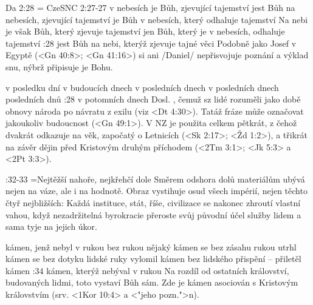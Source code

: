 \renum Da 2:28 = CzeSNC 2:27-27
    {v nebesích je Bůh, zjevující tajemství}  %
    {jest Bůh na nebesích, zjevující tajemství}  %
    {je Bůh v nebesích, který odhaluje tajemství}  %
    {Na nebi je však Bůh, který zjevuje tajemství}  %
    {jen Bůh, který je v nebesích, odhaluje tajemství}  %
:28 {jest Bůh na nebi, kterýž zjevuje tajné věci} Podobně jako Josef v Egyptě (<Gn 40:8>; <Gn 41:16>) si ani \x/Daniel/ nepřisvojuje poznání a výklad snu, nýbrž připisuje je Bohu.

    {v posledku dní} %
    {v budoucích dnech}  %
    {v posledních dnech} %
    {v posledních dnech}  %
    {posledních dnů}  %
:28 {v potomních dnech} Dosl. , čemuž sz lidé rozuměli jako době obnovy národa po návratu z exilu (viz <Dt 4:30>). Tatáž fráze může označovat 
    jakoukoliv budoucnost  (<Gn 49:1>).  V NZ je použita celkem pětkrát, z čehož dvakrát odkazuje na věk, započatý o Letnicích (<Sk 2:17>; <Žd 1:2>), a třikrát na závěr dějin před Kristovým druhým příchodem (<2Tm 3:1>; <Jk 5:3> a <2Pt 3:3>). 

:32-33 {}={Nejtěžší nahoře, nejkřehčí dole} Směrem odshora dolů materiálům ubývá nejen na váze, ale i na hodnotě. Obraz vystihuje osud všech impérií,  nejen těchto čtyř nejbližších: 
    Každá instituce, stát, říše, civilizace se nakonec zhroutí vlastní vahou, když  nezadržitelná byrokracie přeroste svůj původní účel služby lidem a sama tyje na jejich úkor.

    {kámen, jenž nebyl v rukou} %
    {bez rukou nějaký kámen}  %
    {se bez zásahu rukou utrhl kámen} %
    {se bez dotyku lidské ruky vylomil kámen}  %
    {bez lidského přispění -- přiletěl kámen}  %
:34 {kámen, kterýž nebýval v rukou} Na rozdíl od ostatních království, budovaných lidmi, toto vystaví Bůh sám. Zde  je kámen asociován s Kristovým královstvím    (srv. <1Kor 10:4> a <"jeho pozn.">n).

